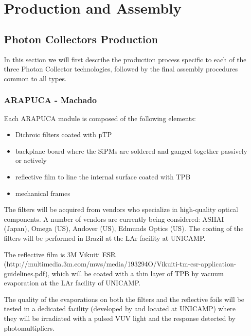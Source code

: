 \section{Production and Assembly}
\label{sec:fdsp-pd-prod-assy}

\subsection{Photon Collectors Production}
\label{sec:fdsp-pd-prod-pc}

In this section we will first describe the production process specific to each of the three Photon Collector technologies, followed by the final assembly procedures common to all types. 

\subsubsection{\color{red}\bf ARAPUCA - Machado}
\label{ssec:fdsp-pd-pc-prod-arapuca}

Each ARAPUCA module is composed of the following elements: 
\begin{itemize}
\item Dichroic filters coated with pTP 
\item backplane board where the SiPMs are soldered and ganged together passively or actively
\item reflective film to line the internal surface coated with TPB 
\item mechanical frames  
\end{itemize}

The filters will be acquired from vendors who specialize in high-quality optical components. A number of vendors are currently being considered: ASHAI (Japan), Omega (US), Andover (US), Edmunds Optics (US). The coating of the filters will be performed in Brazil at the LAr facility at UNICAMP.  

The reflective film is 3M Vikuiti ESR (http://multimedia.3m.com/mws/media/193294O/Vikuiti-tm-esr-application-guidelines.pdf), which will be coated with a thin layer of TPB by vacuum evaporation at the LAr facility of UNICAMP.  

The quality of the evaporations on both the filters and the reflective foils will be tested in a dedicated facility (developed by and located at UNICAMP) where they will be irradiated with a pulsed VUV light and the response detected by photomultipliers.   

